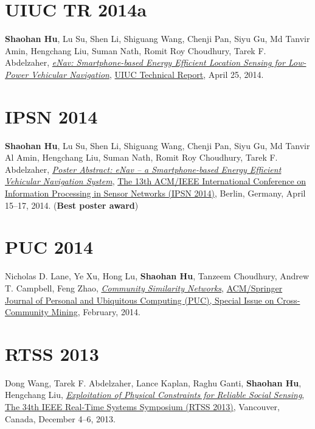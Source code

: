 \section{\sc UIUC TR 2014a }\hypertarget{hu2014uiuc1}{}
\textbf{Shaohan Hu}, Lu Su, Shen Li, Shiguang Wang, Chenji Pan, Siyu Gu, Md Tanvir Amin, Hengchang Liu, Suman Nath, Romit Roy Choudhury, Tarek F. Abdelzaher,
\href{https://www.ideals.illinois.edu/handle/2142/48917}{\emph{eNav: Smartphone-based Energy Efficient Location Sensing for Low-Power Vehicular Navigation}},
\href{http://www.ideals.illinois.edu}{\textsf{UIUC Technical Report}},
April 25, 2014.

\section{\sc IPSN 2014}\hypertarget{hu2014ipsn}{}
\textbf{Shaohan Hu}, Lu Su, Shen Li, Shiguang Wang, Chenji Pan, Siyu Gu, Md Tanvir Al Amin, Hengchang Liu, Suman Nath, Romit Roy Choudhury, Tarek F. Abdelzaher,
\href{http://dl.acm.org/citation.cfm?id=2602374}{\emph{Poster Abstract: eNav -- a Smartphone-based Energy Efficient Vehicular Navigation System}},
\href{http://ipsn.acm.org/2014/}{\textsf{The 13th ACM/IEEE International Conference on Information Processing in Sensor Networks (IPSN 2014)}},
Berlin, Germany, April 15--17, 2014. (\textbf{Best poster award})

\section{\sc PUC 2014}\hypertarget{lane2013puc}{}
Nicholas D. Lane, Ye Xu, Hong Lu, \textbf{Shaohan Hu}, Tanzeem Choudhury, Andrew T. Campbell, Feng Zhao,
\href{http://link.springer.com/article/10.1007/s00779-013-0655-1}{\emph{Community Similarity Networks}},
\href{http://www.springer.com/computer/hci/journal/779}{\textsf{ACM/Springer Journal of Personal and Ubiquitous Computing (PUC), Special Issue on Cross-Community Mining}},
February, 2014.

\section{\sc RTSS 2013}\hypertarget{wang2013rtss}{}
Dong Wang, Tarek F. Abdelzaher, Lance Kaplan, Raghu Ganti, \textbf{Shaohan Hu}, Hengchang Liu,
\href{http://ieeexplore.ieee.org/xpl/articleDetails.jsp?arnumber=6728876}{\emph{Exploitation of Physical Constraints for Reliable Social Sensing}},
\href{http://2013.ieee-rtss.org/}{\textsf{The 34th IEEE Real-Time Systems Symposium (RTSS 2013)}},
Vancouver, Canada, December 4--6, 2013.

